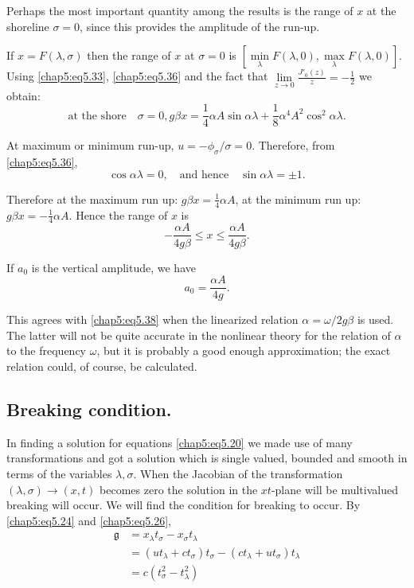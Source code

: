 Perhaps the most important quantity among the results is the range of
$x$ at the shoreline $\sigma =0$, since this provides the amplitude of
the run-up. 

\noindent
If $x=F(\lambda,\sigma)$ then the range of $x$ at $\sigma =0$ is
$[\underset{\lambda}{\min} F(\lambda,0),\underset{\lambda}{\max}
  F(\lambda,0)]$. Using \eqref{chap5:eq5.33}, \eqref{chap5:eq5.36} and
the fact that $\underset{z\to 0}{\lim}\frac{J'_0(z)}{z}= -\frac{1}{2}$
we obtain: 
$$
\text{at the shore}\quad\sigma=0, g\beta x=\frac{1}{4}\alpha A\sin\alpha \lambda +\frac{1}{8}\alpha^4A^2\cos^2\alpha\lambda.
$$

At maximum or minimum run-up, $u= -\phi_\sigma/\sigma =0$. Therefore, from \eqref{chap5:eq5.36},
$$
\cos\alpha\lambda =0,\quad\text{and hence}\quad\sin\alpha\lambda =\pm 1.
$$

Therefore at the maximum run up: $g\beta x=\frac{1}{4}\alpha A$, at the minimum run up: $g\beta x=-\frac{1}{4}\alpha A$. Hence the range of $x$ is 
$$
-\frac{\alpha A}{4g\beta}\leq x\leq\frac{\alpha A}{4g\beta}.
$$\pageoriginale

If $a_0$ is the vertical amplitude, we have 
\begin{equation}
a_0=\frac{\alpha A}{4g}.\tag{5.40}\label{chap5:eq5.40}
\end{equation}

This agrees with \eqref{chap5:eq5.38} when the linearized relation $\alpha=\omega/2g\beta$ is used. The latter will not be quite accurate in the nonlinear theory for the relation of $\alpha$ to the frequency $\omega$, but it is probably a good enough approximation; the exact relation could, of course, be calculated.

\subsection*{\bf Breaking condition.}

In finding a solution for equations \eqref{chap5:eq5.20} we made use of many transformations and got a solution which is single valued, bounded and smooth in terms of the variables $\lambda,\sigma$. When the Jacobian of the transformation $(\lambda,\sigma)\to(x,t)$ becomes zero the solution in the $xt$-plane will be multivalued \ie breaking will occur. We will find the condition for breaking to occur. By \eqref{chap5:eq5.24} and \eqref{chap5:eq5.26},
\begin{align*}
\mathfrak{g} &= x_\lambda t_\sigma - x_\sigma t_\lambda\\
&= \left(ut_\lambda +ct_\sigma\right)t_\sigma-\left(ct_\lambda +ut_\sigma\right)t_\lambda\\
&= c\left(t_\sigma^2 -t_\lambda^2\right)
\end{align*}

